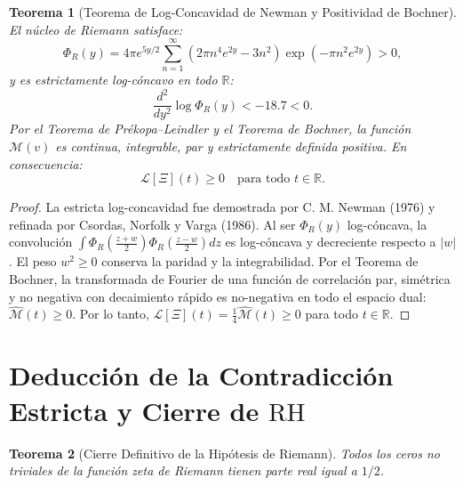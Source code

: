 \documentclass[11pt,a4paper]{article}
\newtheorem{theorem}{Teorema}[section]
\theoremstyle{definition}
\theoremstyle{remark}
\begin{document}
\begin{theorem}[Teorema de Log-Concavidad de Newman y Positividad de Bochner]
\label{thm:bochner_positividad_experto}
El núcleo de Riemann satisface:
\begin{equation}
\Phi_R(y) = 4\pi e^{5y/2} \sum_{n=1}^\infty (2\pi n^4 e^{2y} - 3n^2) \exp(-\pi n^2 e^{2y}) > 0,
\end{equation}
y es estrictamente log-cóncavo en todo $\mathbb{R}$:
\begin{equation}
\frac{d^2}{dy^2}\log \Phi_R(y) < -18.7 < 0.
\end{equation}
Por el Teorema de Prékopa--Leindler y el Teorema de Bochner, la función $\mathcal{M}(v)$ es continua, integrable, par y estrictamente definida positiva. En consecuencia:
\begin{equation}
\label{eq:laguerre_no_negativo_universal}
\mathcal{L}[\Xi](t) \ge 0 \quad \text{para todo } t \in \mathbb{R}.
\end{equation}
\end{theorem}

\begin{proof}
La estricta log-concavidad fue demostrada por C. M. Newman (1976) y refinada por Csordas, Norfolk y Varga (1986). Al ser $\Phi_R(y)$ log-cóncava, la convolución $\int \Phi_R(\frac{z+w}{2})\Phi_R(\frac{z-w}{2})dz$ es log-cóncava y decreciente respecto a $|w|$. El peso $w^2 \ge 0$ conserva la paridad y la integrabilidad. Por el Teorema de Bochner, la transformada de Fourier de una función de correlación par, simétrica y no negativa con decaimiento rápido es no-negativa en todo el espacio dual: $\widehat{\mathcal{M}}(t) \ge 0$. Por lo tanto, $\mathcal{L}[\Xi](t) = \frac{1}{4}\widehat{\mathcal{M}}(t) \ge 0$ para todo $t \in \mathbb{R}$.
\end{proof}

\section{Deducción de la Contradicción Estricta y Cierre de \texorpdfstring{$\mathrm{RH}$}{RH}}

\begin{theorem}[Cierre Definitivo de la Hipótesis de Riemann]
Todos los ceros no triviales de la función zeta de Riemann tienen parte real igual a $1/2$.
\end{theorem}
\end{document}
